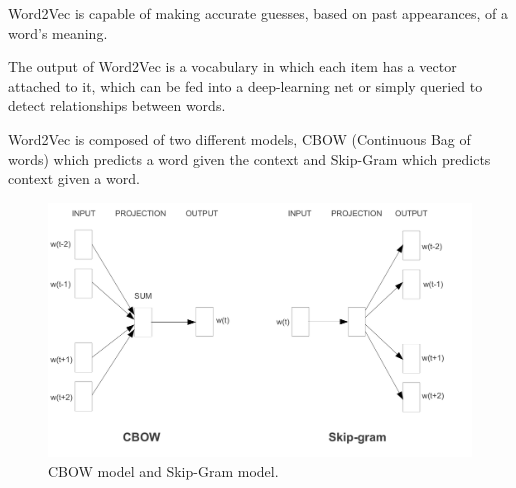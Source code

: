 \begin{figure}[H]
          \end{figure}




        
        \par Word2Vec is capable of making accurate guesses, based on past appearances, of a word's meaning. 

        \par The output of Word2Vec is a vocabulary in which each item has a vector attached to it, which can be fed into a deep-learning net or simply queried to detect relationships between words.

        \par Word2Vec is composed of two different models, CBOW (Continuous Bag of words) which predicts a word given the context and Skip-Gram which predicts context given a word. \cite{Mikolov2013} \cite{Wiki}

        

        \begin{figure}[htb]
            \centering
            \includegraphics[scale = 0.15]{Sections/3StateOfTheArt/3_images/Cbow_Skip.png}
            \caption{CBOW model and Skip-Gram model. \cite{Mikolov2013}} 
        \end{figure}

        
